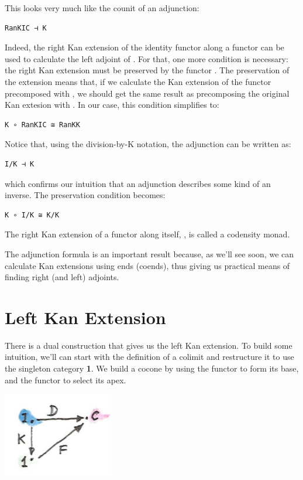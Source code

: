 This looks very much like the counit of an adjunction:

\begin{verbatim}
RanKIC ⊣ K
\end{verbatim}

Indeed, the right Kan extension of the identity functor along a functor
 can be used to calculate the left adjoint of . For
that, one more condition is necessary: the right Kan extension must be
preserved by the functor . The preservation of the extension
means that, if we calculate the Kan extension of the functor precomposed
with , we should get the same result as precomposing the
original Kan extesion with . In our case, this condition
simplifies to:

\begin{verbatim}
K ∘ RanKIC ≅ RanKK
\end{verbatim}

Notice that, using the division-by-K notation, the adjunction can be
written as:

\begin{verbatim}
I/K ⊣ K
\end{verbatim}

which confirms our intuition that an adjunction describes some kind of
an inverse. The preservation condition becomes:

\begin{verbatim}
K ∘ I/K ≅ K/K
\end{verbatim}

The right Kan extension of a functor along itself, , is
called a codensity monad.

The adjunction formula is an important result because, as we'll see
soon, we can calculate Kan extensions using ends (coends), thus giving
us practical means of finding right (and left) adjoints.

\section{Left Kan Extension}\label{left-kan-extension}

There is a dual construction that gives us the left Kan extension. To
build some intuition, we'll can start with the definition of a colimit
and restructure it to use the singleton category \textbf{1}. We build a
cocone by using the functor  to form its
base, and the functor  to select its apex.

\includegraphics[width=1.90625in]{images/kan81.jpg}

